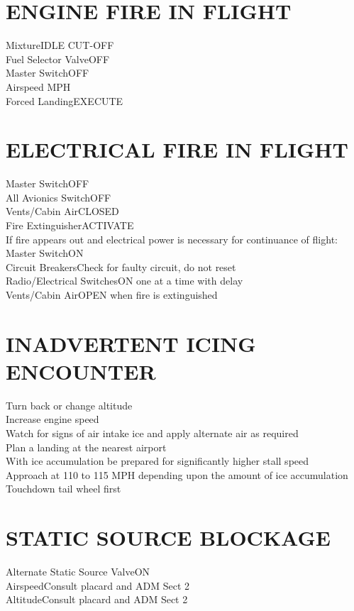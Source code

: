 \documentclass{article}
\begin{document}
\begin{multicols*}{2}
\section*{ENGINE FIRE IN FLIGHT}
Mixture\dotfill IDLE CUT-OFF\\
Fuel Selector Valve\dotfill OFF\\
Master Switch\dotfill OFF\\
Airspeed MPH\\
Forced Landing\dotfill EXECUTE
\section*{ELECTRICAL FIRE IN FLIGHT}
Master Switch\dotfill OFF\\
All Avionics Switch\dotfill OFF\\
Vents/Cabin Air\dotfill CLOSED\\
Fire Extinguisher\dotfill ACTIVATE\\
If fire appears out and electrical power is necessary for continuance of flight:\\
Master Switch\dotfill ON\\
Circuit Breakers\dotfill Check for faulty circuit, do not reset\\
Radio/Electrical Switches\dotfill ON one at a time with delay\\
Vents/Cabin Air\dotfill OPEN when fire is extinguished
\section*{INADVERTENT ICING ENCOUNTER}
Turn back or change altitude\\
Increase engine speed\\
Watch for signs of air intake ice and apply alternate air as required\\
Plan a landing at the nearest airport\\
With ice accumulation be prepared for significantly higher stall speed\\
Approach at 110 to 115 MPH depending upon the amount of ice accumulation\\
Touchdown tail wheel first
\section*{STATIC SOURCE BLOCKAGE}
Alternate Static Source Valve\dotfill ON\\
Airspeed\dotfill Consult placard and ADM Sect 2\\
Altitude\dotfill Consult placard and ADM Sect 2
\end{multicols*}
\end{document}
